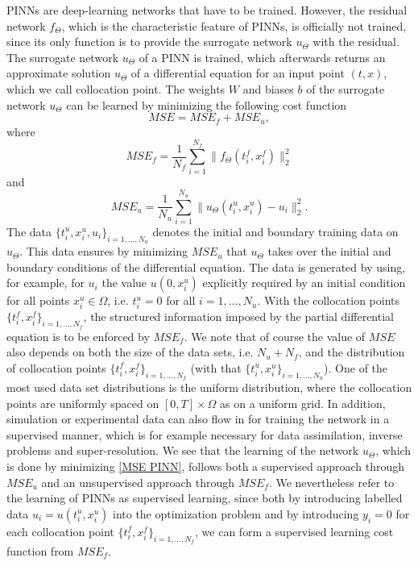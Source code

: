 PINNs are deep-learning networks that have to be trained. However, the residual network $f_\Theta$, which is the characteristic feature of PINNs, is officially not trained, since its only function is to provide the surrogate network $u_\Theta$ with the residual. The surrogate network $u_\Theta$ of a PINN is trained, which afterwards returns an approximate solution $u_\Theta$ of a differential equation for an input point $(t,x)$, which we call collocation point. The weights $W$ and biases $b$ of the surrogate network $u_\Theta$ can be learned by minimizing the following cost function
\begin{equation}
    \label{MSE PINN}
    MSE = MSE_f + MSE_u, 
\end{equation}
where
\begin{equation*}
    MSE_f = \frac{1}{N_f} \sum^{N_f}_{i = 1} \lVert f_\Theta (t^{f}_i, x^{f}_i) \rVert^{2}_{2}
\end{equation*}
and
\begin{equation*}
    MSE_u = \frac{1}{N_u} \sum^{N_u}_{i = 1} \lVert u_\Theta(t^{u}_i, x^{u}_i) - u_i \rVert^{2}_{2}.
\end{equation*}
The data $\{t^{u}_i, x^{u}_i, u_i \}_{i = 1, \ldots, N_u}$ denotes the initial and boundary training data on $u_\Theta$. This data ensures by minimizing $MSE_u$ that $u_\Theta$ takes over the initial and boundary conditions of the differential equation. The data is generated by using, for example, for $u_i$ the value $u(0,x^{u}_i)$ explicitly required by an initial condition for all points $x^{u}_i \in \Omega$, i.e. $t^{u}_i = 0$ for all $i = 1, \ldots, N_u$. With the collocation points $\{t^{f}_i, x^{f}_i \}_{i = 1, \ldots, N_f}$, the structured information imposed by the partial differential equation is to be enforced by $MSE_f$. We note that of course the value of $MSE$ also depends on both the size of the data sets, i.e. $N_u + N_f$, and the distribution of collocation points $\{t^{f}_i, x^{f}_i \}_{i = 1, \ldots, N_f}$ (with that $\{t^{u}_i, x^{u}_i \}_{i = 1, \ldots, N_u}$). One of the most used data set distributions is the uniform distribution, where the collocation points are uniformly spaced on $\left[ 0, T \right] \times \Omega$ as on a uniform grid. In addition, simulation or experimental data can also flow in for training the network in a supervised manner, which is for example necessary for data assimilation, inverse problems and super-resolution. We see that the learning of the network $u_\Theta$, which is done by minimizing \cref{MSE PINN}, follows both a supervised approach through $MSE_u$ and an unsupervised approach through $MSE_f$. We nevertheless refer to the learning of PINNs as supervised learning, since both by introducing labelled data  $u_i = u(t^{u}_i, x^{u}_i)$ into the optimization problem and by introducing $y_i=0$ for each collocation point $\{t^{f}_i, x^{f}_i \}_{i = 1, \ldots, N_f}$, we can form a supervised learning cost function from $MSE_f$. 

